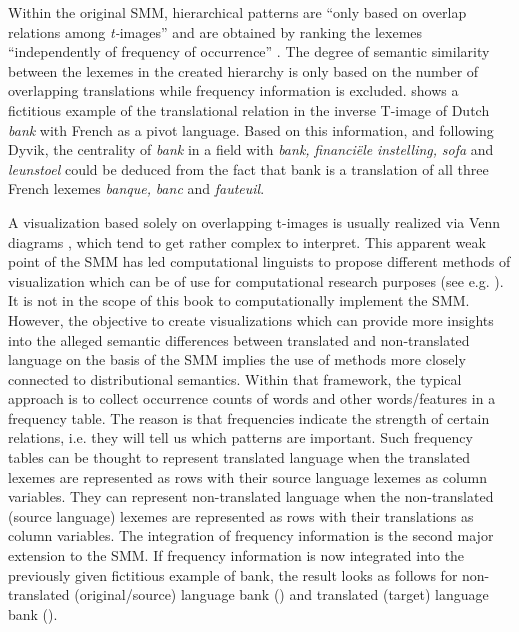 Within the original SMM, hierarchical patterns are “only based on overlap relations among \textit{t-}images” and are obtained by ranking the lexemes “independently of frequency of occurrence” \citep[73]{johansson_translational_1998}. The degree of semantic similarity between the lexemes in the created hierarchy is only based on the number of overlapping translations while frequency information is excluded.  shows a fictitious example of the translational relation in the inverse T-image of Dutch \textit{bank} with French as a pivot language. Based on this information, and following Dyvik, the centrality of \textit{bank} in a field with \textit{bank,} \textit{financiële} \textit{instelling,} \textit{sofa} and \textit{leunstoel} could be deduced from the fact that bank is a translation of all three French lexemes \textit{banque,} \textit{banc} and \textit{fauteuil}.

A visualization based solely on overlapping t-images is usually realized via Venn diagrams \citep{dyvik_semantic_2011}, which tend to get rather complex to interpret. This apparent weak point of the SMM has led computational linguists to propose different methods of visualization which can be of use for computational research purposes (see e.g. \citealt{ganter_conceptual_2005}). It is not in the scope of this book to computationally implement the SMM. However, the objective to create visualizations which can provide more insights into the alleged semantic differences between translated and non-translated language on the basis of the SMM implies the use of methods more closely connected to distributional semantics. Within that framework, the typical approach is to collect occurrence counts of words and other words\slash features in a frequency table. The reason is that frequencies indicate the strength of certain relations, i.e. they will tell us which patterns are important. Such frequency tables can be thought to represent translated language when the translated lexemes are represented as rows with their source language lexemes as column variables. They can represent non-translated language when the non-translated (source language) lexemes are represented as rows with their translations as column variables. The integration of frequency information is the second major extension to the SMM. If frequency information is now integrated into the previously given fictitious example of bank, the result looks as follows for non-translated (original\slash source) language bank () and translated (target) language bank ().


